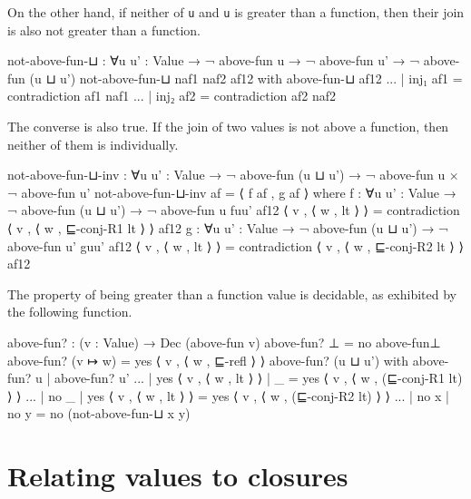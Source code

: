 On the other hand, if neither of \texttt{u} and
\texttt{u\textquotesingle{}} is greater than a function, then their join
is also not greater than a function.

\begin{fence}
\begin{code}
not-above-fun-⊔ : ∀{u u' : Value}
               → ¬ above-fun u → ¬ above-fun u'
               → ¬ above-fun (u ⊔ u')
not-above-fun-⊔ naf1 naf2 af12
    with above-fun-⊔ af12
... | inj₁ af1 = contradiction af1 naf1
... | inj₂ af2 = contradiction af2 naf2
\end{code}
\end{fence}

The converse is also true. If the join of two values is not above a
function, then neither of them is individually.

\begin{fence}
\begin{code}
not-above-fun-⊔-inv : ∀{u u' : Value} → ¬ above-fun (u ⊔ u')
              → ¬ above-fun u × ¬ above-fun u'
not-above-fun-⊔-inv af = ⟨ f af , g af ⟩
  where
    f : ∀{u u' : Value} → ¬ above-fun (u ⊔ u') → ¬ above-fun u
    f{u}{u'} af12 ⟨ v , ⟨ w , lt ⟩ ⟩ =
        contradiction ⟨ v , ⟨ w , ⊑-conj-R1 lt ⟩ ⟩ af12
    g : ∀{u u' : Value} → ¬ above-fun (u ⊔ u') → ¬ above-fun u'
    g{u}{u'} af12 ⟨ v , ⟨ w , lt ⟩ ⟩ =
        contradiction ⟨ v , ⟨ w , ⊑-conj-R2 lt ⟩ ⟩ af12
\end{code}
\end{fence}

The property of being greater than a function value is decidable, as
exhibited by the following function.

\begin{fence}
\begin{code}
above-fun? : (v : Value) → Dec (above-fun v)
above-fun? ⊥ = no above-fun⊥
above-fun? (v ↦ w) = yes ⟨ v , ⟨ w , ⊑-refl ⟩ ⟩
above-fun? (u ⊔ u')
    with above-fun? u | above-fun? u'
... | yes ⟨ v , ⟨ w , lt ⟩ ⟩ | _ = yes ⟨ v , ⟨ w , (⊑-conj-R1 lt) ⟩ ⟩
... | no _ | yes ⟨ v , ⟨ w , lt ⟩ ⟩ = yes ⟨ v , ⟨ w , (⊑-conj-R2 lt) ⟩ ⟩
... | no x | no y = no (not-above-fun-⊔ x y)
\end{code}
\end{fence}

\hypertarget{relating-values-to-closures}{%
\section{Relating values to
closures}\label{relating-values-to-closures}}

